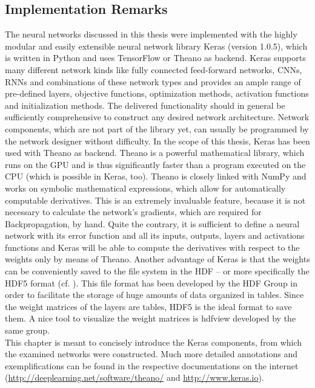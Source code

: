 \documentclass[11pt, a4paper]{article}
\begin{document}
\begin{appendix}
\section{Implementation Remarks}
\label{app:implementationremarks}
The neural networks discussed in this thesis were implemented with the highly modular and easily extensible neural network library Keras \cite{keras} (version 1.0.5), which is written in Python and uses TensorFlow or Theano \cite{theano} as backend. Keras supports many different network kinds like fully connected feed-forward networks, \acp{CNN}, \acp{RNN} and combinations of these network types and provides an ample range of pre-defined layers, objective functions, optimization methods, activation functions and initialization methods. The delivered functionality should in general be sufficiently comprehensive to construct any desired network architecture. Network components, which are not part of the library yet, can usually be programmed by the network designer without difficulty. In the scope of this thesis, Keras has been used with Theano as backend. Theano is a powerful mathematical library, which runs on the \ac{GPU} and is thus significantly faster than a program executed on the \ac{CPU} (which is possible in Keras, too). Theano is closely linked with NumPy and works on symbolic mathematical expressions, which allow for automatically computable derivatives. This is an extremely invaluable feature, because it is not necessary to calculate the network's gradients, which are required for Backpropagation, by hand. Quite the contrary, it is sufficient to define a neural network with its error function and all its inputs, outputs, layers and activations functions and Keras will be able to compute the derivatives with respect to the weights only by means of Theano. Another advantage of Keras is that the weights can be conveniently saved to the file system in the \ac{HDF} -- or more specifically the HDF5 format (cf. \cite{hdf5}). This file format has been developed by the HDF Group in order to facilitate the storage of huge amounts of data organized in tables. Since the weight matrices of the layers are tables, \ac{HDF}5 is the ideal format to save them. A nice tool to visualize the weight matrices is hdfview developed by the same group.\\
This chapter is meant to concisely introduce the Keras components, from which the examined networks were constructed. Much more detailed annotations and exemplifications can be found in the respective documentations on the internet (\url{http://deeplearning.net/software/theano/} and \url{http://www.keras.io}).


\end{appendix}
\end{document}
